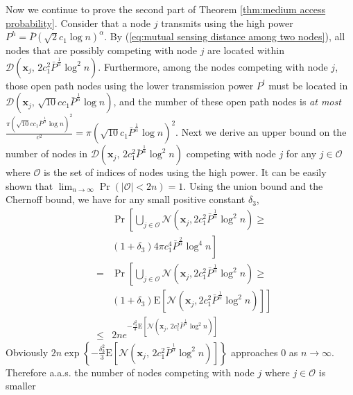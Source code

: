 \documentclass[english]{IEEEtran}
\theoremstyle{plain}
\theoremstyle{plain}
\theoremstyle{plain}
\theoremstyle{remark}
\begin{document}
Now we continue to prove the second part of Theorem \ref{thm:medium access probability}.
Consider that a node $j$ transmits using the high power $P^{h}=\bar{P}\left(\sqrt{2}c_{1}\log n\right)^{\alpha}$.
By (\ref{eq:mutual sensing distance among two nodes}), all nodes
that are possibly competing with node $j$ are located within $\mathcal{D}\left(\boldsymbol{x}_{j},\,2c_{1}^{2}\bar{P}^{\frac{1}{\alpha}}\log^{2}n\right)$.
Furthermore, among the nodes competing with node $j$, those open
path nodes using the lower transmission power $P^{l}$ must be located
in $\mathcal{D}\left(\boldsymbol{x}_{j},\,\sqrt{10}cc_{1}\bar{P}^{\frac{1}{\alpha}}\log n\right)$,
and the number of these open path nodes is \emph{at most} $\frac{\pi\left(\sqrt{10}cc_{1}\bar{P}^{\frac{1}{\alpha}}\log n\right)^{2}}{c^{2}}=\pi\left(\sqrt{10}c_{1}\bar{P}^{\frac{1}{\alpha}}\log n\right)^{2}$.
Next we derive an upper bound on the number of nodes in $\mathcal{D}\left(\boldsymbol{x}_{j},\,2c_{1}^{2}\bar{P}^{\frac{1}{\alpha}}\log^{2}n\right)$
competing with node $j$ for any $j\in\mathcal{O}$ where $\mathcal{O}$
is the set of indices of nodes using the high power. It can be easily
shown that $\lim_{n\rightarrow\infty}\Pr\left(\left|\mathcal{O}\right|<2n\right)=1$.
Using the union bound and the Chernoff bound, we have for any small
positive constant $\delta_{3}$,
\begin{eqnarray*}
 &  & \Pr\left[\bigcup_{j\in\mathcal{O}}\mathcal{N}\left(\boldsymbol{x}_{j},2c_{1}^{2}\bar{P}^{\frac{1}{\alpha}}\log^{2}n\right)\geq\right.\\
 &  & \left.\left(1+\delta_{3}\right)4\pi c_{1}^{4}\bar{P}^{\frac{2}{\alpha}}\log^{4}n\right]\\
 & = & \Pr\left[\bigcup_{j\in\mathcal{O}}\mathcal{N}\left(\boldsymbol{x}_{j},2c_{1}^{2}\bar{P}^{\frac{1}{\alpha}}\log^{2}n\right)\geq\right.\\
 &  & \left.\left(1+\delta_{3}\right)\textrm{E}\left[\mathcal{N}\left(\boldsymbol{x}_{j},2c_{1}^{2}\bar{P}^{\frac{1}{\alpha}}\log^{2}n\right)\right]\right]\\
 & \leq & 2ne^{-\frac{\delta_{3}^{2}}{3}\textrm{E}\left[\mathcal{N}\left(\boldsymbol{x}_{j},\,2c_{1}^{2}\bar{P}^{\frac{1}{\alpha}}\log^{2}n\right)\right]}
\end{eqnarray*}
Obviously $2n\exp\left\{ -\frac{\delta_{3}^{2}}{3}\textrm{E}\left[\mathcal{N}\left(\boldsymbol{x}_{j},\,2c_{1}^{2}\bar{P}^{\frac{1}{\alpha}}\log^{2}n\right)\right]\right\} $
approaches $0$ as $n\rightarrow\infty$. Therefore a.a.s. the number
of nodes competing with node $j$ where $j\in\mathcal{O}$ is smaller
\end{document}
